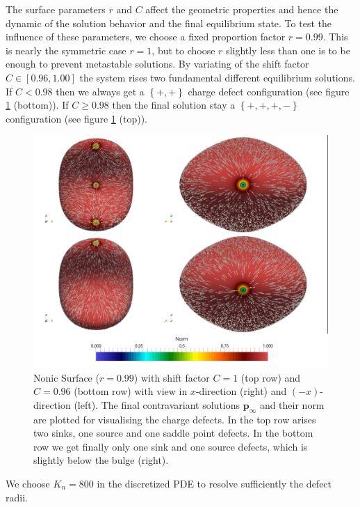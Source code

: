 \documentclass[a4paper,11pt]{scrartcl}
\newcommand{\p}{\mathbf{p}}
\begin{document}
    The surface parameters \( r \) and \( C \) affect the geometric properties and hence the dynamic of the solution behavior and the final
    equilibrium state.
    To test the influence of these parameters, we choose a fixed proportion factor \( r=0.99 \).
    This is nearly the symmetric case \( r=1 \), but to choose \( r \) slightly less than one is to be enough to prevent metastable
    solutions.
    By variating of the shift factor \( C\in\left[ 0.96 , 1.00 \right] \) the system rises two fundamental different equilibrium solutions.
    If \( C < 0.98 \) then we always get a \( \left\{ + , + \right\} \) charge defect configuration
    (see figure \ref{figNonicCompare} (bottom)).
    If \( C \ge 0.98 \) then the final solution stay a \( \left\{ + , +, + , - \right\} \) configuration
    (see figure \ref{figNonicCompare} (top)).
    \begin{figure}
      \centering
      \includegraphics[width=.9\textwidth]{bilder/NonicCompareFinal.png}
      \caption{Nonic Surface (\( r=0.99 \)) with shift factor \( C = 1 \) (top row) and \( C = 0.96 \) (bottom row)
               with view in \( x \)-direction (right) and \( (-x) \)-direction (left).
               The final contravariant solutions \( \p_{\infty} \) and their norm are plotted for visualising the charge defects.
               In the top row arises two sinks, one source and one saddle point defects.
               In the bottom row we get finally only one sink and one source defects, which is slightly below the bulge (right). 
               }
      \label{figNonicCompare}
    \end{figure}
    We choose \( K_{n} = 800 \) in the discretized PDE to resolve sufficiently the defect radii.
\end{document}
